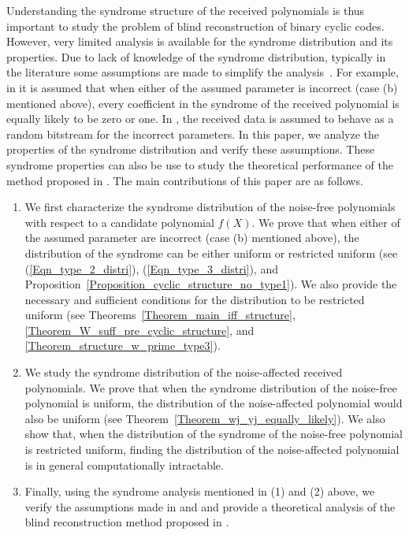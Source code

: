 \documentclass[10pt,journal]{IEEEtran}
\begin{document}
Understanding the syndrome structure of the received polynomials is thus important to
study the problem of blind reconstruction of binary cyclic codes.
However, very limited analysis is available for the syndrome distribution and its properties.
% 
Due to lack of knowledge of the syndrome distribution, typically in the literature some assumptions are made
to simplify the analysis~\cite{Zhou2013_Entropy,Zhou2013_Entropy_new}. 
% 
For example, in \cite{Zhou2013_Entropy_new} it is assumed that when either of the assumed parameter is incorrect (case (b) mentioned above), 
every coefficient in the syndrome of the received polynomial is equally likely to be zero or one.
In \cite{Zhou2013_Entropy}, the received data is assumed to behave as a random bitstream for the incorrect parameters.
% 
In this paper, we analyze the properties of the syndrome distribution and verify these assumptions.
% 
These syndrome properties can also be use to study the theoretical performance of the method proposed in \cite{TCOMM_2016}.
% 
The main contributions of this paper are as follows.
% 
\begin{enumerate}[(1)]
%  
\item We first characterize the syndrome distribution of the noise-free polynomials with respect to a candidate polynomial $f(X)$.
We prove that when either of the assumed parameter are incorrect (case (b) mentioned above), the distribution of the syndrome can 
be either uniform or restricted uniform (see (\ref{Eqn_type_2_distri}), (\ref{Eqn_type_3_distri}), 
and Proposition~\ref{Proposition_cyclic_structure_no_type1}).
% 
We also provide the necessary and sufficient conditions for the distribution to be restricted uniform 
(see Theorems~\ref{Theorem_main_iff_structure}, \ref{Theorem_W_suff_pre_cyclic_structure}, and \ref{Theorem_structure_w_prime_type3}).
% 
\item We study the syndrome distribution of the noise-affected received polynomials. 
We prove that when the syndrome distribution of the noise-free polynomial
is uniform, the distribution of the noise-affected polynomial would also be uniform (see Theorem~\ref{Theorem_wj_yj_equally_likely}).
We also show that, when the distribution of the syndrome of the noise-free polynomial is restricted uniform, 
finding the distribution of the noise-affected polynomial is in general computationally intractable.
% 
\item Finally, using the syndrome analysis mentioned in (1) and (2) above,
we verify the assumptions made in \cite{Zhou2013_Entropy} and \cite{Zhou2013_Entropy_new} and provide a 
theoretical analysis of the blind reconstruction method proposed in \cite{TCOMM_2016}.
%  
\end{enumerate}
% 
\end{document}

